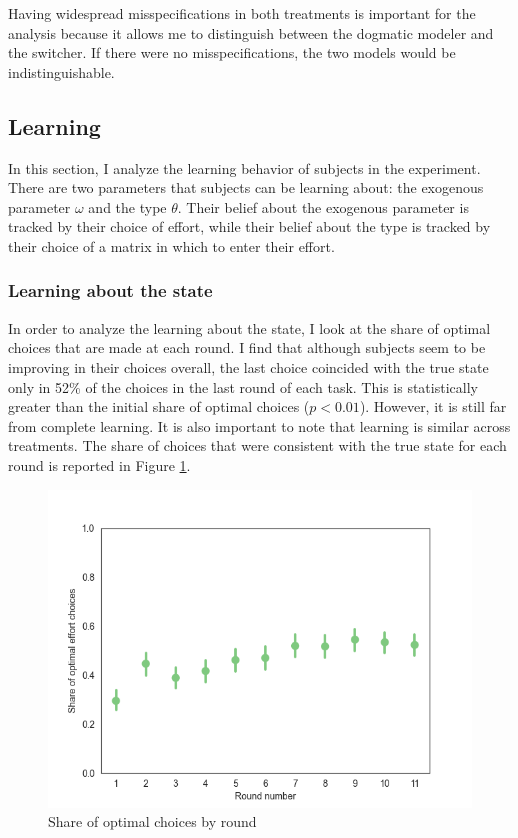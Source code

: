 \documentclass[
  12pt,
]{article}
\begin{document}
Having widespread misspecifications in both treatments is important for
the analysis because it allows me to distinguish between the dogmatic
modeler and the switcher. If there were no misspecifications, the two
models would be indistinguishable.

\hypertarget{learning}{%
\subsection{Learning}\label{learning}}

In this section, I analyze the learning behavior of subjects in the
experiment. There are two parameters that subjects can be learning
about: the exogenous parameter \(\omega\) and the type \(\theta\). Their
belief about the exogenous parameter is tracked by their choice of
effort, while their belief about the type is tracked by their choice of
a matrix in which to enter their effort.

\hypertarget{learning-about-the-state}{%
\subsubsection{Learning about the
state}\label{learning-about-the-state}}

In order to analyze the learning about the state, I look at the share of
optimal choices that are made at each round. I find that although
subjects seem to be improving in their choices overall, the last choice
coincided with the true state only in 52\% of the choices in the last
round of each task. This is statistically greater than the initial share
of optimal choices (\(p<0.01\)). However, it is still far from complete
learning. It is also important to note that learning is similar across
treatments. The share of choices that were consistent with the true
state for each round is reported in Figure
\ref{fig:optimal-choices-by-round}.

\begin{figure}
\hypertarget{fig:optimal-choices-by-round}{%
\centering
\includegraphics{../figures/effort_learning.png}
\caption{Share of optimal choices by
round}\label{fig:optimal-choices-by-round}
}
\end{figure}
\end{document}
